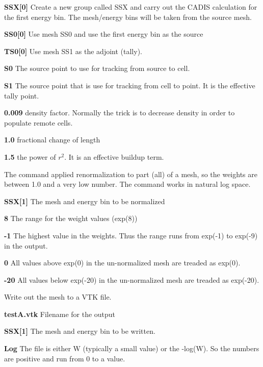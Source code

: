\begin{description}
\begin{description}
    \begin{description}
    \item {\bf SSX[0]} Create a new group called SSX and carry out the
      CADIS calculation for the first energy bin. The mesh/energy bins
      will be taken from the source mesh.    
    \item {\bf SS0[0]} Use mesh SS0 and use the first energy bin as the source
    \item {\bf TS0[0]} Use mesh SS1 as the adjoint (tally).
    \item {\bf S0} The source point to use for tracking from source to cell.
    \item {\bf S1} The source point that is use for tracking from cell to point. It is the effective
      tally point.
    \item {\bf 0.009} density factor. Normally the trick is to decrease density in order to populate remote cells.
    \item {\bf 1.0} fractional change of length
    \item {\bf 1.5} the power of $r^2$. It is an effective buildup term.
    \end{description}
    

  \item[--wwgNORM] The command applied renormalization to part (all) of a mesh, so the weights
    are between 1.0 and a very low number. The command works in natural log space.
    \begin{description}
    \item {\bf SSX[1]} The mesh and energy bin to be normalized
    \item {\bf 8} The range for the weight values (exp(8))
    \item {\bf -1} The highest value in the weights.
      Thus the range runs from exp(-1) to exp(-9) in the output.
    \item {\bf 0} All values above exp(0) in the un-normalized mesh are
      treaded as exp(0).
    \item {\bf -20} All values below exp(-20) in the un-normalized mesh are treaded as exp(-20).
    \end{description}
    
\item[--wwgVTK] Write out the mesh to a VTK file.
\begin{description}
  \item {\bf testA.vtk} Filename for the output
  \item {\bf SSX[1]} The mesh and energy bin to be written.
  \item {\bf Log} The file is either W (typically a small value) or
    the -log(W). So the numbers are positive and run from 0 to a value.
\end{description}

\end{description}

\end{description}
